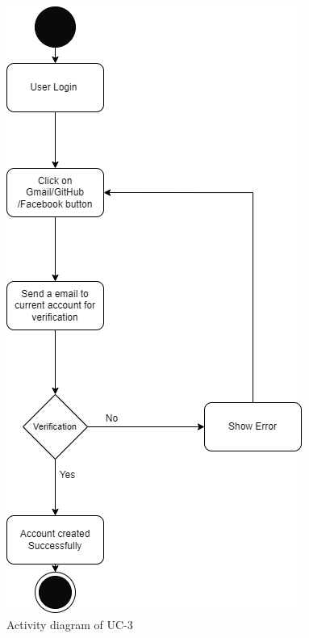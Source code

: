 \begin{figure}[H]
    \centering
    \includegraphics[scale=0.7]{./diagrams/Activity Diagram/ad-03.png}
    \caption{Activity diagram of UC-3}
    \label{fig:act-03}

\end{figure}


